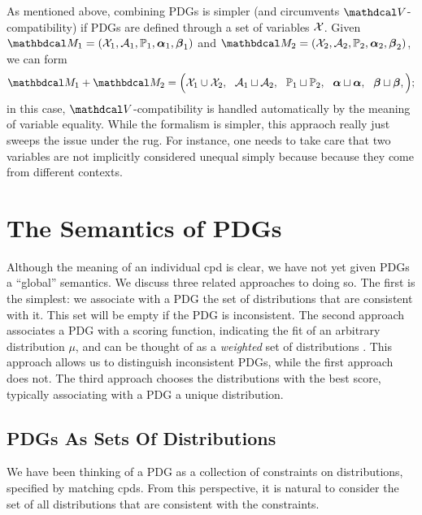 As mentioned above, combining PDGs is simpler (and circumvents $\V$-compatibility) if PDGs are defined through a set of variables $\mathcal X$. 
Given
$\dg M_1 = (\X_1, \Ar_1, \mathbb P_1, \balpha_1,\bbeta_1)$ and
$\dg M_2 = (\X_2, \Ar_2, \mathbb P_2, \balpha_2,\bbeta_2)$,
we can form
\[
	\dg M_1 + \dg M_2 =
		\Big(
			\X_1 \cup \X_2,~~
			\Ar_1 \sqcup \Ar_2,~~
			\mathbb P_1 \sqcup \mathbb P_2,~~
			\balpha \sqcup \balpha,~~
			\bbeta \sqcup \bbeta,
		\Big);
\]
in this case, $\V$-compatibility is handled automatically by
the meaning of variable equality. 
While the formalism is simpler, this appraoch really just sweeps the issue under the rug. 
For instance, one needs to take care that two variables are not implicitly considered unequal simply because because they come from different contexts. 


\section{The Semantics of PDGs}\label{sec:semantics}
Although the meaning of an individual cpd is clear, we have not yet given 
PDGs a ``global'' semantics. We discuss three related approaches to doing so.
The first is the simplest: we associate with a PDG the set of distributions that
are consistent with it. This set will be empty if the PDG is inconsistent.
The second approach associates a PDG with a scoring function, indicating the fit
of an arbitrary distribution $\mu$, and can be thought of as a \emph{weighted}
set of distributions \cite{HL12}. This approach allows us to distinguish
inconsistent PDGs, while the first approach does not. The third approach chooses
the distributions with the best score, typically associating with a PDG a unique
distribution.

\subsection{PDGs As Sets Of Distributions}\label{sec:set-of-distribution-semantics} 
We have been thinking of a PDG as a collection of constraints on distributions,
specified by matching cpds. From this perspective, it is natural to consider the
set of all distributions that are consistent with the constraints.


